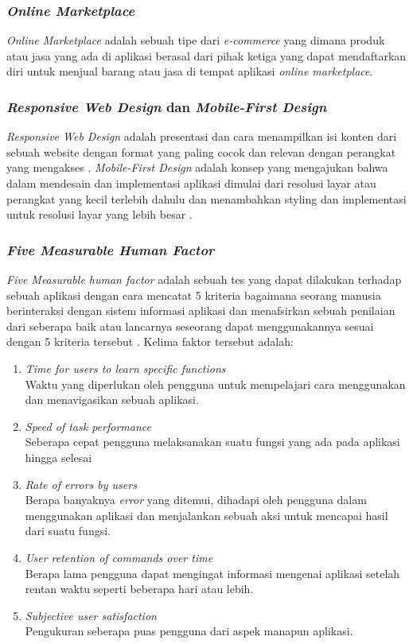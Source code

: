 \documentclass[a4paper]{article}
\newcommand{\subsubbab}[1]{%
    \subsubsection{#1}%
}
\begin{document}
\subsubbab{\textit{Online Marketplace}}
\textit{Online Marketplace} adalah sebuah tipe dari \textit{e-commerce} yang dimana  produk atau jasa yang ada di aplikasi berasal dari pihak ketiga yang dapat mendaftarkan diri untuk menjual barang atau jasa di tempat aplikasi \textit{online marketplace}. \autocite{pediaa_marketplace}

\subsubbab{\textit{Responsive Web Design} dan \textit{Mobile-First Design}}
\textit{Responsive Web Design} adalah presentasi dan cara menampilkan isi konten dari sebuah website dengan format yang paling cocok dan relevan dengan perangkat yang mengakses \autocite[5]{Frain_2022}. \textit{Mobile-First Design} adalah konsep yang mengajukan bahwa dalam mendesain dan implementasi aplikasi dimulai dari resolusi layar atau perangkat yang kecil terlebih dahulu dan menambahkan styling dan implementasi untuk resolusi layar yang lebih besar \autocite[5]{Ward_2017}.

\subsubbab{\textit{Five Measurable Human Factor}}
\textit{Five Measurable human factor} adalah sebuah tes yang dapat dilakukan terhadap sebuah aplikasi dengan cara mencatat 5 kriteria bagaimana seorang manusia berinteraksi dengan sistem informasi aplikasi dan menafsirkan sebuah penilaian dari seberapa baik atau lancarnya seseorang dapat menggunakannya sesuai dengan 5 kriteria tersebut \autocite[192-193]{Shneiderman_Plaisant_Cohen_Jacobs_Elmqvist_2018_5_factors}. Kelima faktor tersebut adalah:
\begin{enumerate}
    \item \textit{Time for users to learn specific functions}\\
    Waktu yang diperlukan oleh pengguna untuk mempelajari cara menggunakan dan menavigasikan sebuah aplikasi.
    \item \textit{Speed of task performance}\\
    Seberapa cepat pengguna melaksanakan suatu fungsi yang ada pada aplikasi hingga selesai
    \item \textit{Rate of errors by users}\\
    Berapa banyaknya \textit{error} yang ditemui, dihadapi oleh pengguna dalam menggunakan aplikasi dan menjalankan sebuah aksi untuk mencapai hasil dari suatu fungsi.
    \item \textit{User retention of commands over time}\\
    Berapa lama pengguna dapat mengingat informasi mengenai aplikasi setelah rentan waktu seperti beberapa hari atau lebih.
    \item \textit{Subjective user satisfaction}\\
    Pengukuran seberapa puas pengguna dari aspek manapun aplikasi.
\end{enumerate}
\end{document}

